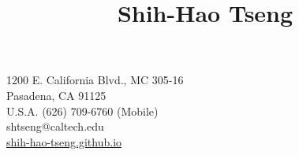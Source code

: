 \title{Shih-Hao Tseng}{
1200 E. California Blvd., MC 305-16\\
Pasadena, CA 91125\\%
U.S.A.
}{
(626) 709-6760 (Mobile)\\
shtseng@caltech.edu\\ %
\href{http://shih-hao-tseng.github.io}{shih-hao-tseng.github.io}%
}